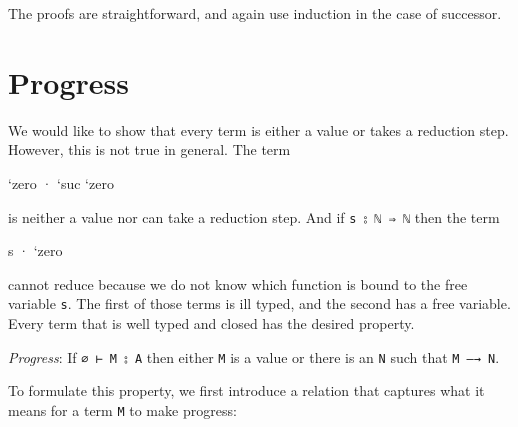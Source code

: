 The proofs are straightforward, and again use induction in the case of
successor.

\hypertarget{progress}{%
\section{Progress}\label{progress}}

We would like to show that every term is either a value or takes a
reduction step. However, this is not true in general. The term

\begin{myDisplay}
`zero · `suc `zero
\end{myDisplay}

is neither a value nor can take a reduction step. And if
\texttt{s\ ⦂\ \textasciigrave{}ℕ\ ⇒\ \textasciigrave{}ℕ} then the term

\begin{myDisplay}
 s · `zero
\end{myDisplay}

cannot reduce because we do not know which function is bound to the free
variable \texttt{s}. The first of those terms is ill typed, and the
second has a free variable. Every term that is well typed and closed has
the desired property.

\emph{Progress}: If \texttt{∅\ ⊢\ M\ ⦂\ A} then either \texttt{M} is a
value or there is an \texttt{N} such that \texttt{M\ —→\ N}.

To formulate this property, we first introduce a relation that captures
what it means for a term \texttt{M} to make progress:

